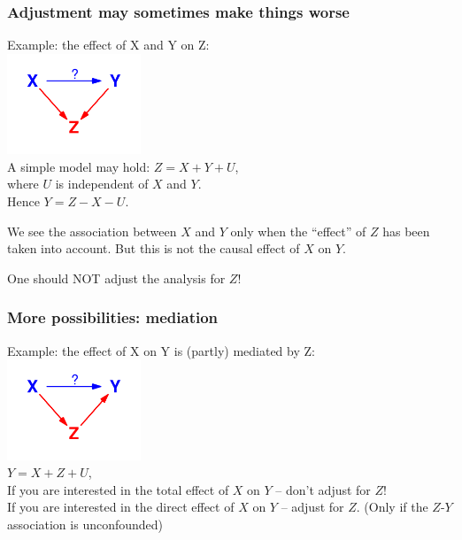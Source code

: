 \documentclass[xcolor=svgnames,handout]{beamer}
\begin{document}
\begin{frame}
\frametitle{Adjustment may sometimes make things worse}
Example: the effect of X and Y on  Z:   \\[-0.2cm]
\includegraphics[width=4cm]{wrongadjust}\\[-0.3cm]
A simple model may hold:
$Z = X + Y + U$, \\
where $U$ is independent of $X$ and $Y$. \\
Hence $Y = Z - X - U$.

\pause
\alert<1>{We see the association between $X$ and $Y$ only when the ``effect'' of  $Z$ has been taken into account.
But this is not the causal effect of $X$ on $Y$.}

\alert<2>{One should NOT adjust the analysis for $Z$!}
\end{frame}

\begin{frame}
\frametitle{More possibilities: mediation}
Example: the effect of X on Y is (partly) \alert{mediated} by  Z:   \\[-0.2cm]
\includegraphics[width=4cm]{mediation}\\[-0.3cm]

$Y = X + Z + U$, \\

\pause
If you are interested in the \alert{total effect} of $X$ on $Y$ -- don't adjust for $Z$! \\

\pause
If you are interested in the \alert{direct effect} of $X$ on $Y$ -- adjust for $Z$. (Only if the $Z$-$Y$ association is unconfounded)
\end{frame}

\end{document}
